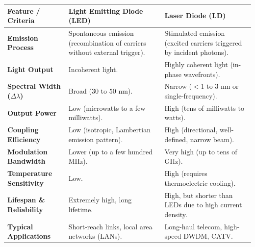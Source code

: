 \begin{table}[H]
\centering
\begin{tabular}{|p{}|p{}|p{}|}
\hline
Feature / Criteria & Light Emitting Diode (LED) & Laser Diode (LD) \\
\hline
\textbf{Emission Process} & Spontaneous emission (recombination of carriers without external trigger). & Stimulated emission (excited carriers triggered by incident photons). \\
\hline
\textbf{Light Output} & Incoherent light. & Highly coherent light (in-phase wavefronts). \\
\hline
\textbf{Spectral Width ($\Delta\lambda$)} & Broad ($30 \text{ to } 50\text{ nm}$). & Narrow ($< 1 \text{ to } 3\text{ nm}$ or single-frequency). \\
\hline
\textbf{Output Power} & Low (microwatts to a few milliwatts). & High (tens of milliwatts to watts). \\
\hline
\textbf{Coupling Efficiency} & Low (isotropic, Lambertian emission pattern). & High (directional, well-defined, narrow beam). \\
\hline
\textbf{Modulation Bandwidth} & Lower (up to a few hundred MHz). & Very high (up to tens of GHz). \\
\hline
\textbf{Temperature Sensitivity} & Low. & High (requires thermoelectric cooling). \\
\hline
\textbf{Lifespan \& Reliability} & Extremely high, long lifetime. & High, but shorter than LEDs due to high current density. \\
\hline
\textbf{Typical Applications} & Short-reach links, local area networks (LANs). & Long-haul telecom, high-speed DWDM, CATV. \\
\hline
\end{tabular}
\end{table}


